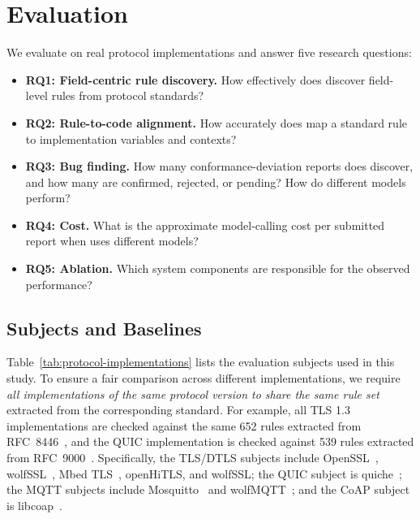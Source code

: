 \section{Evaluation}
\label{sec:evaluation}


We evaluate \tool{} on real protocol implementations and answer five research
questions:
\begin{itemize}[leftmargin=*]
  \item \textbf{RQ1: Field-centric rule discovery.} How effectively does
  \tool{} discover field-level rules from protocol standards?
  \item \textbf{RQ2: Rule-to-code alignment.} How accurately does \tool{} map a
  standard rule to implementation variables and contexts?
  \item \textbf{RQ3: Bug finding.} How many conformance-deviation reports does
  \tool{} discover, and how many are confirmed, rejected, or pending? How do
  different models perform?
  \item \textbf{RQ4: Cost.} What is the approximate model-calling cost per 
  submitted report when \tool{} uses different models?
  \item \textbf{RQ5: Ablation.} Which system components are responsible for the
  observed performance?
\end{itemize}

\subsection{Subjects and Baselines}

Table~\ref{tab:protocol-implementations} lists the evaluation subjects used in
this study. To ensure a fair comparison across different implementations, we
require \emph{all implementations of the same protocol version to share the same rule
set} extracted from the corresponding standard. For example, all TLS 1.3 
implementations are checked against the same 652 rules extracted from
RFC~8446~\cite{rfc8446}, and the QUIC implementation is checked against
539 rules extracted from RFC~9000~\cite{rfc9000}. Specifically, the
TLS/DTLS subjects include OpenSSL~\cite{openssl}, wolfSSL~\cite{wolfssl},
Mbed TLS~\cite{mbedtls}, openHiTLS, and wolfSSL; the QUIC
subject is quiche~\cite{quiche}; the MQTT
subjects include Mosquitto~\cite{mosquitto} and wolfMQTT~\cite{wolfmqtt}; and
the CoAP subject is libcoap~\cite{libcoap}.

